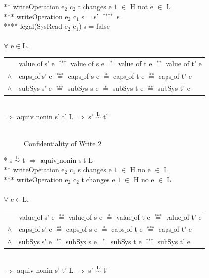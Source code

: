 \documentclass[pdftex,11pt,a4paper]{article}
\begin{document}
** writeOperation e$_2$ c$_2$ t changes e$\_1$ $\in$ H not e $\in$ L \\
*** writeOperation e$_2$ c$_1$ s = s' $\overset{\text{****}}{=}$ s \\
**** legal(SysRead e$_2$ c$_1$) s = false \\ \\
$\forall$ e$\in$L. \\
\begin{tabular}{ll}
& value$\_$of s' e $\overset{\text{***}}{=}$ value$\_$of s e $\overset{\text{*}}{=}$ value$\_$of t e $\overset{\text{**}}{=}$ value$\_$of t' e \\
$\wedge$ & caps$\_$of s' e $\overset{\text{***}}{=}$ caps$\_$of s e $\overset{\text{*}}{=}$ caps$\_$of t e $\overset{\text{**}}{=}$ caps$\_$of t' e \\
$\wedge$ & subSys s' e $\overset{\text{***}}{=}$ subSys s e $\overset{\text{*}}{=}$ subSys t e $\overset{\text{**}}{=}$ subSys t' e
\end{tabular} \\
$\Rightarrow$ aquiv$\_$nonin s' t' L $\Rightarrow$ s' $\overset{\text{L}}{\sim}$ t' \\ \\
\begin{figure}[H]
\caption{Confidentiality of Write 2}
\end{figure}
* s $\overset{\text{L}}{\sim}$ t $\Rightarrow$ aquiv$\_$nonin s t L	\\ 
** writeOperation e$_2$ c$_1$ s changes e$\_1$ $\in$ H no e $\in$ L \\ 
*** writeOperation e$_2$ c$_2$ t changes e$\_1$ $\in$ H no e $\in$ L \\ \\
$\forall$ e$\in$L. \\
\begin{tabular}{ll}
& value$\_$of s' e $\overset{\text{**}}{=}$ value$\_$of s e $\overset{\text{*}}{=}$ value$\_$of t e $\overset{\text{***}}{=}$ value$\_$of t' e \\
$\wedge$ & caps$\_$of s' e $\overset{\text{**}}{=}$ caps$\_$of s e $\overset{\text{*}}{=}$ caps$\_$of t e $\overset{\text{***}}{=}$ caps$\_$of t' e \\
$\wedge$ & subSys s' e $\overset{\text{**}}{=}$ subSys s e $\overset{\text{*}}{=}$ subSys t e $\overset{\text{***}}{=}$ subSys t' e
\end{tabular} \\
$\Rightarrow$ aquiv$\_$nonin s' t' L $\Rightarrow$ s' $\overset{\text{L}}{\sim}$ t' 
\end{document}
